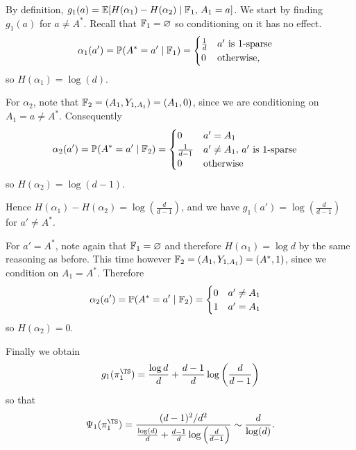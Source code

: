 \documentclass[11pt, openany]{book}
\begin{document}
\begin{example}
\begin{itemize}
\begin{itemize}
            By definition, $g_1(a) = \mathbb{E}[H(\alpha_1) - H(\alpha_2) \mid \mathbb{F}_1,\,A_1=a]$. We start by finding $g_1(a)$ for $a\neq A^*$. Recall that $\mathbb{F}_1=\varnothing$ so conditioning on it has no effect.
            \begin{align*}
                \alpha_1(a') & = \mathbb{P}(A^* = a' \mid \mathbb{F}_1) = \begin{cases}
                                 \frac{1}{d} & \text{$a'$ is $1$-sparse} \\
                                 0 & \text{otherwise},
                             \end{cases}
            \end{align*}
            so $H(\alpha_1) = \log(d)$.

            For $\alpha_2$, note that $\mathbb{F}_2 = (A_1,Y_{1,A_1}) = (A_1,0)$, since we are conditioning on $A_1=a\neq A^*$. Consequently
            \begin{align*}
                \alpha_2(a') & = \mathbb{P}(A^* = a' \mid \mathbb{F}_2) = \begin{cases}
                                  0 & a' = A_1 \\
                                  \frac{1}{d-1} & a' \neq A_1, \,\text{$a'$ is $1$-sparse} \\
                                  0 & \text{otherwise}
                              \end{cases}
            \end{align*}
            so $H(\alpha_2) = \log(d-1)$.

            Hence $H(\alpha_1)-H(\alpha_2) = \log\left(\frac{d}{d-1}\right)$, and we have $g_1(a') = \log\left(\frac{d}{d-1}\right)$ for $a'\neq A^*$.

            For $a'=A^*$, note again that $\mathbb{F}_1=\varnothing$ and therefore $H(\alpha_1)=\log d$ by the same reasoning as before. This time however $\mathbb{F}_2=(A_1,Y_{1,A_1}) = (A^*,1)$, since we condition on $A_1=A^*$. Therefore
            \begin{align*}
                \alpha_2(a') & = \mathbb{P}(A^*=a'\mid\mathbb{F}_2) = \begin{cases}
                                  0 & a'\neq A_1 \\
                                  1 & a'=A_1
                              \end{cases}
            \end{align*}
            so $H(\alpha_2)=0$.

            Finally we obtain 
            \[
                g_1(\pi_1^{\TS}) = \frac{\log d}{d} + \frac{d-1}{d}\log\left(\frac{d}{d-1}\right)
            \]
            so that
            \[
                \Psi_1(\pi_1^{\TS}) = \frac{(d-1)^2/d^2}{\frac{\log(d)}{d} + \frac{d-1}{d}\log\left(\frac{d}{d-1}\right)} \sim \frac{d}{\log(d)}.
            \]


\end{itemize}
\end{itemize}
\end{example}
\end{document}
